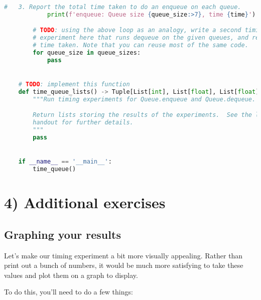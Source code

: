 \documentclass[12pt]{article}
\begin{document}
\begin{lstlisting}[language=Python,caption={timequeue.py},captionpos=b]
            #   3. Report the total time taken to do an enqueue on each queue.
            print(f'enqueue: Queue size {queue_size:>7}, time {time}')

        # TODO: using the above loop as an analogy, write a second timing
        # experiment here that runs dequeue on the given queues, and reports the
        # time taken. Note that you can reuse most of the same code.
        for queue_size in queue_sizes:
            pass


    # TODO: implement this function
    def time_queue_lists() -> Tuple[List[int], List[float], List[float]]:
        """Run timing experiments for Queue.enqueue and Queue.dequeue.

        Return lists storing the results of the experiments.  See the lab
        handout for further details.
        """
        pass


    if __name__ == '__main__':
        time_queue()
\end{lstlisting}

\section*{4) Additional exercises}
\subsection*{Graphing your results}
Let’s make our timing experiment a bit more visually appealing. Rather than print
out a bunch of numbers, it would be much more satisfying to take these values and
plot them on a graph to display.

\bigskip

\noindent To do this, you’ll need to do a few things:
\end{document}
